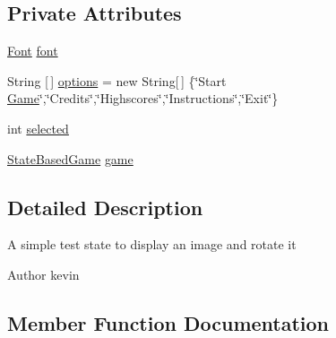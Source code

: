 \subsection*{Private Attributes}
\begin{DoxyCompactItemize}
\item 
\mbox{\hyperlink{interfaceorg_1_1newdawn_1_1slick_1_1_font}{Font}} \mbox{\hyperlink{classorg_1_1newdawn_1_1slick_1_1tests_1_1states_1_1_test_state3_a7e7969f51b4cab9b70539243e13703f0}{font}}
\item 
String \mbox{[}$\,$\mbox{]} \mbox{\hyperlink{classorg_1_1newdawn_1_1slick_1_1tests_1_1states_1_1_test_state3_a9065e2b5ba1de5f67640ce5787582d5b}{options}} = new String\mbox{[}$\,$\mbox{]} \{\char`\"{}Start \mbox{\hyperlink{interfaceorg_1_1newdawn_1_1slick_1_1_game}{Game}}\char`\"{},\char`\"{}Credits\char`\"{},\char`\"{}Highscores\char`\"{},\char`\"{}Instructions\char`\"{},\char`\"{}Exit\char`\"{}\}
\item 
int \mbox{\hyperlink{classorg_1_1newdawn_1_1slick_1_1tests_1_1states_1_1_test_state3_a124621e929a74fd0ee0cb374eda7d667}{selected}}
\item 
\mbox{\hyperlink{classorg_1_1newdawn_1_1slick_1_1state_1_1_state_based_game}{State\+Based\+Game}} \mbox{\hyperlink{classorg_1_1newdawn_1_1slick_1_1tests_1_1states_1_1_test_state3_a769f07538782627db0be9ce0043b356f}{game}}
\end{DoxyCompactItemize}


\subsection{Detailed Description}
A simple test state to display an image and rotate it

\begin{DoxyAuthor}{Author}
kevin 
\end{DoxyAuthor}


\subsection{Member Function Documentation}
\mbox{\label{classorg_1_1newdawn_1_1slick_1_1tests_1_1states_1_1_test_state3_a0cd328d3f5ef77423e54e7e51ff87dab}} 
